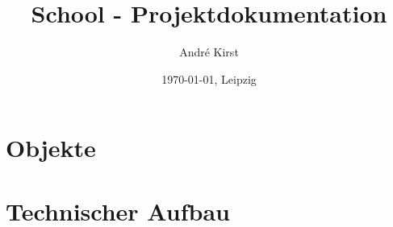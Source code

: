 \documentclass[12pt]{book}
\author{Andr\'{e} Kirst}
\date{\today{}, Leipzig}
\title{School - Projektdokumentation}
\begin{document}
\pagestyle{fancy} %
\fancyhf{} %
\fancyhead[C]{} %
\fancyhead[R]{} %
\renewcommand{\headrulewidth}{0.4pt} %
\fancyfoot[C]{\thepage} %
\renewcommand{\footrulewidth}{0.4pt} %

\fancyhead[OR]{} %
\fancyhead[ER]{} %


\maketitle



\newpage

\tableofcontents

\chapter{Objekte}


\chapter{Technischer Aufbau}
\end{document}
